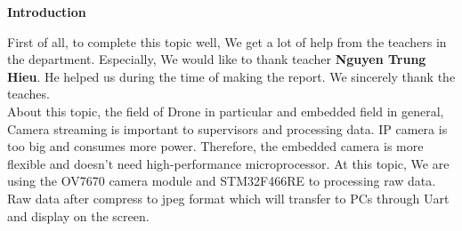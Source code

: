 \documentclass[D:/Latex/Internship/Report/Latex/Report.tex]{subfiles}
\begin{document}
	\begin{center}
	\Large \textbf{Introduction}
	\end{center}
	\vspace{1cm}
	First of all, to complete this topic well, We get a lot of help from the teachers in the department.
	Especially, We would like to thank teacher \textbf{Nguyen Trung Hieu}. He helped us during the time
	of making the report. We sincerely thank the teaches.	\\	
	\doublespacing
	About this topic, the field of Drone in particular and embedded field in general, Camera streaming
	 is important to supervisors and processing data. IP camera is too big and consumes more power. 
	 Therefore, the embedded camera is more flexible and doesn't need high-performance microprocessor. 
	 At this topic, We are using the OV7670 camera module and STM32F466RE to processing raw data. Raw data
	 after compress to jpeg format which will transfer to PCs through Uart and display on the screen.
\end{document}
